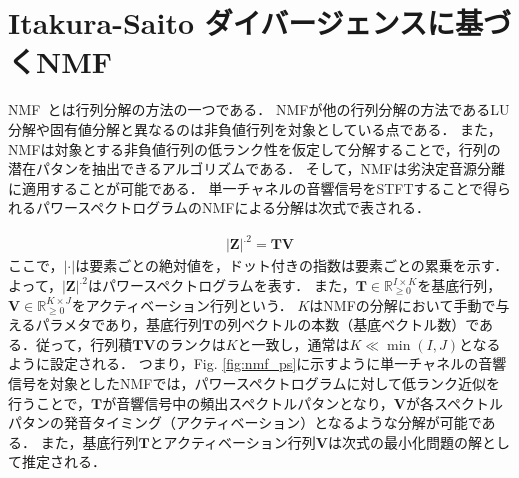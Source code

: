 \section{Itakura-Saito ダイバージェンスに基づくNMF}
\label{sec:conv:isnmf}

NMF~\cite{NMF}とは行列分解の方法の一つである．
NMFが他の行列分解の方法であるLU分解や固有値分解と異なるのは非負値行列を対象としている点である．
また，NMFは対象とする非負値行列の低ランク性を仮定して分解することで，行列の潜在パタンを抽出できるアルゴリズムである．
そして，NMFは劣決定音源分離に適用することが可能である\cite{singlechsep, supNMF, MNMF_oz}．
単一チャネルの音響信号をSTFTすることで得られるパワースペクトログラムのNMFによる分解は次式で表される．

\begin{align}
    |\bm{Z}|^{.2} = \bm{TV}
\end{align}
ここで，$| \cdot |$は要素ごとの絶対値を，ドット付きの指数は要素ごとの累乗を示す．よって，$|\bm{Z}|^{.2}$はパワースペクトログラムを表す．
また，$\bm{T} \in \mathbb{R}^{I \times K}_{\geq 0}$を基底行列，$\bm{V} \in \mathbb{R}^{K \times J}_{\geq 0}$をアクティベーション行列という．
$K$はNMFの分解において手動で与えるパラメタであり，基底行列$\bm{T}$の列ベクトルの本数（基底ベクトル数）である．従って，行列積$\bm{TV}$のランクは$K$と一致し，通常は$K \ll \min (I,J)$となるように設定される．
つまり，Fig. \ref{fig:nmf_ps}に示すように単一チャネルの音響信号を対象としたNMFでは，パワースペクトログラムに対して低ランク近似を行うことで，$\bm{T}$が音響信号中の頻出スペクトルパタンとなり，$\bm{V}$が各スペクトルパタンの発音タイミング（アクティベーション）となるような分解が可能である．
また，基底行列$\bm{T}$とアクティベーション行列$\bm{V}$は次式の最小化問題の解として推定される．


